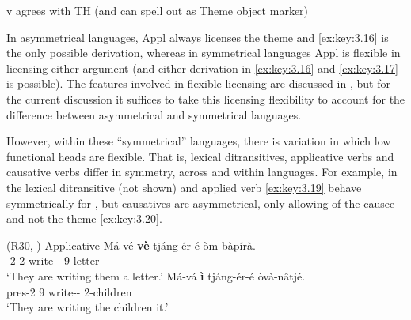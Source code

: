 \documentclass[output=paper]{langsci/langscibook}
\begin{document}
\ea\label{ex:key:3.17}v agrees with \gls{TH} (and can spell out as Theme object marker)
\z

In asymmetrical languages, Appl always licenses the theme and \eqref{ex:key:3.16}
is the only possible derivation, whereas in symmetrical languages Appl is
flexible in licensing either argument (and either derivation in \eqref{ex:key:3.16}
and \eqref{ex:key:3.17} is possible). The features involved in flexible licensing
are discussed in \Textcite{vanderWal2017}, but for the current discussion it
suffices to take this licensing flexibility to account for the difference
between asymmetrical and symmetrical languages.

However, within these “symmetrical” languages, there is variation in which low
functional heads are flexible. That is, lexical ditransitives, applicative
verbs and causative verbs differ in symmetry, across and within languages. For
example, in  the lexical
ditransitive (not shown) and applied verb \eqref{ex:key:3.19} behave
symmetrically for , but causatives are asymmetrical, only
allowing  of the causee and not the theme \eqref{ex:key:3.20}.

\ea\label{ex:key:3.19} (R30, \citealt[247]{MartenKula2012})
    \sn Applicative
	\ea
	\gll	 Má-vé  \textbf{vè}  tjáng-ér-é  òm-bàpírà.\\
	    \Prs{}-2\Sm{}  2\Om{}  write-\Appl{}{}-\Fv{}  9-letter \\
	\glt    ‘They are writing them a letter.’
	\ex
	\gll	 Má-vá  \textbf{ì}  tjáng-ér-é  òvà-nâtjé.\\
	    pres-2\Sm{}  9\Om{}  write-\Appl{}{}-\Fv{}  2-children\\
	\glt    ‘They are writing the children it.’
	\z
\z
\end{document}
